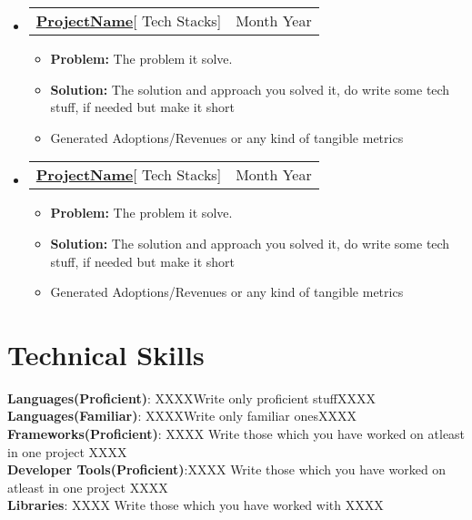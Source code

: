 \documentclass[letterpaper,11pt]{article}
\makeatletter
\newcommand{\resumeItem}[1]{
  \item\small{
    {#1 \vspace{-2pt}}
  }
}
\newcommand{\resumeProjectHeading}[2]{
    \item
    \begin{tabular*}{0.97\textwidth}{l@{\extracolsep{\fill}}r}
      \small#1 & #2 \\
    \end{tabular*}\vspace{-7pt}
}
\newcommand{\resumeSubHeadingListStart}{\begin{itemize}[leftmargin=0.15in, label={}]}
\newcommand{\resumeSubHeadingListEnd}{\end{itemize}}
\newcommand{\resumeItemListStart}{\begin{itemize}}
\newcommand{\resumeItemListEnd}{\end{itemize}\vspace{-5pt}}
\makeatother
\begin{document}
\resumeSubHeadingListStart
      \resumeProjectHeading
          {\textbf{\href{projectLiveLink}{ProjectName}}{[ Tech Stacks]}}{Month Year}
          \resumeItemListStart
           \resumeItem{\textbf{Problem:} The problem it solve.}
           \resumeItem{\textbf{Solution:} The solution and approach you solved it, do write some tech stuff, if needed but make it short}
           \resumeItem{Generated Adoptions/Revenues or any kind of tangible metrics}
          \resumeItemListEnd
    \resumeSubHeadingListEnd
\resumeSubHeadingListStart
      \resumeProjectHeading
          {\textbf{\href{projectLiveLink}{ProjectName}}{[ Tech Stacks]}}{Month Year}
          \resumeItemListStart
           \resumeItem{\textbf{Problem:} The problem it solve.}
           \resumeItem{\textbf{Solution:} The solution and approach you solved it, do write some tech stuff, if needed but make it short}
           \resumeItem{Generated Adoptions/Revenues or any kind of tangible metrics}
          \resumeItemListEnd
    \resumeSubHeadingListEnd


%
\section{Technical Skills}
 \begin{itemize}[leftmargin=0.15in, label={}]
    \small{\item{
     \textbf{Languages(Proficient)}{: XXXXWrite only proficient stuffXXXX} \\
      \textbf{Languages(Familiar)}{: XXXXWrite only familiar onesXXXX } \\
     \textbf{Frameworks(Proficient)}{: XXXX Write those which you have worked on atleast in one project XXXX  } \\
     \textbf{Developer Tools(Proficient)}{:XXXX Write those which you have worked on atleast in one project XXXX } \\
     \textbf{Libraries}{: XXXX Write those which you have worked with XXXX  }
    }}
 \end{itemize}
\end{document}
